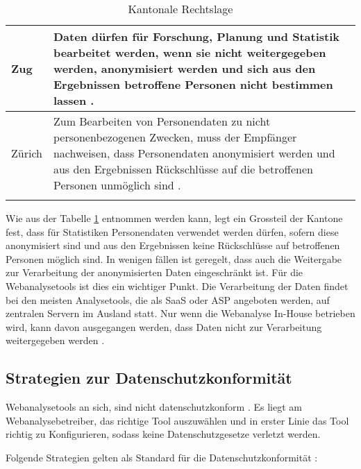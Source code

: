 \begin{longtable}{| p{} | p{}|}
		\hline
    Zug & Daten dürfen für Forschung, Planung und Statistik bearbeitet werden, wenn sie nicht weitergegeben werden, anonymisiert werden und sich aus den Ergebnissen betroffene Personen nicht bestimmen lassen \parencite[§§ 4 Abs 1e]{DSSGZG}. \\
		\hline
    Zürich & Zum Bearbeiten von Personendaten zu nicht personenbezogenen Zwecken, muss der Empfänger nachweisen, dass Personendaten anonymisiert werden und aus den Ergebnissen Rückschlüsse auf die betroffenen Personen unmöglich sind \parencite[§§ 18 Abs. 1-2]{DSSGZH}. \\
		\hline

    \caption{Kantonale Rechtslage}
    \label{tab: ktrechtslage}
	\end{longtable}

  Wie aus der Tabelle \ref{tab: ktrechtslage} entnommen werden kann,
  legt ein Grossteil der Kantone fest, dass für Statistiken Personendaten verwendet werden dürfen, sofern diese anonymisiert sind und aus den Ergebnissen keine Rückschlüsse auf betroffenen Personen möglich sind. In wenigen fällen ist geregelt, dass auch die Weitergabe zur Verarbeitung der anonymisierten Daten eingeschränkt ist. Für die Webanalysetools ist dies ein wichtiger Punkt. Die Verarbeitung der Daten findet bei den meisten Analysetools, die als SaaS oder ASP angeboten werden, auf zentralen Servern im Ausland statt. Nur wenn die Webanalyse In-House betrieben wird, kann davon ausgegangen werden, dass Daten nicht zur Verarbeitung weitergegeben werden \parencite[S 174-176]{nakatani2011toolselectionmethod}.


\subsection{Strategien zur Datenschutzkonformität}
Webanalysetools an sich, sind nicht datenschutzkonform \parencite[S. 1-4]{EcommerceUndDatenschutz}. Es liegt am Webanalysebetreiber, das richtige Tool auszuwählen und in erster Linie das Tool richtig zu Konfigurieren, sodass keine Datenschutzgesetze verletzt werden.

Folgende Strategien gelten als Standard für die Datenschutzkonformität \parencite[S. 2-5]{EcommerceUndDatenschutz}:

